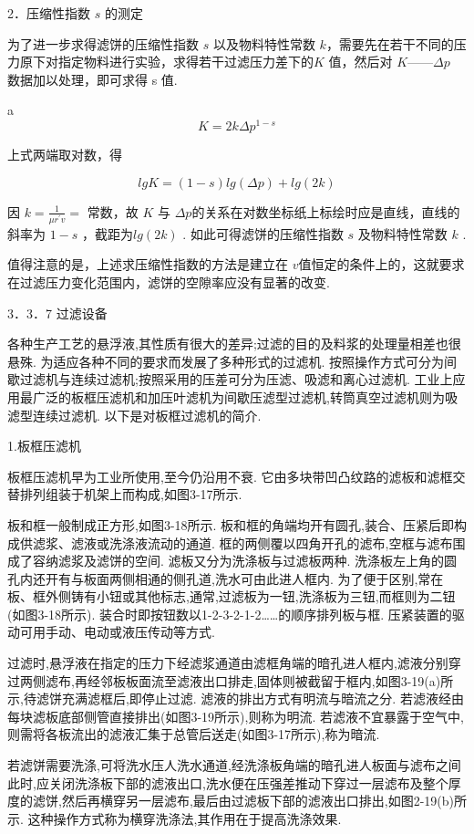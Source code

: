 \documentclass[
]{article}
\begin{document}
2．压缩性指数 \(s\) 的测定

为了进一步求得滤饼的压缩性指数 \(s\) 以及物料特性常数 \(k\)，需要先在若干不同的压力原下对指定物料进行实验，求得若干过滤压力差下的\(K\) 值，然后对 \(K——\Delta p\) 数据加以处理，即可求得 s 值. 

a\[K = 2k\Delta p^{1 - s}\]

上式两端取对数，得

\[lgK = (1 - s)lg(\Delta p) + lg(2k)\]

因 \(k = \frac{1}{\mu r^{'}v} =\) 常数，故 \(K\) 与 \(\Delta p\)的关系在对数坐标纸上标绘时应是直线，直线的斜率为 \(1 - s\) ，截距为\(lg(2k)\) . 如此可得滤饼的压缩性指数 \(s\) 及物料特性常数 \(k\) . 

值得注意的是，上述求压缩性指数的方法是建立在 \(v\)值恒定的条件上的，这就要求在过滤压力变化范围内，滤饼的空隙率应没有显著的改变. 

3．3．7 过滤设备

各种生产工艺的悬浮液,其性质有很大的差异;过滤的目的及料浆的处理量相差也很悬殊. 为适应各种不同的要求而发展了多种形式的过滤机. 按照操作方式可分为间歇过滤机与连续过滤机;按照采用的压差可分为压滤、吸滤和离心过滤机. 工业上应用最广泛的板框压滤机和加压叶滤机为间歇压滤型过滤机,转筒真空过滤机则为吸滤型连续过滤机. 以下是对板框过滤机的简介.

1.板框压滤机

板框压滤机早为工业所使用,至今仍沿用不衰. 它由多块带凹凸纹路的滤板和滤框交替排列组装于机架上而构成,如图3-17所示. 

板和框一般制成正方形,如图3-18所示. 板和框的角端均开有圆孔,装合、压紧后即构成供滤浆、滤液或洗涤液流动的通道. 框的两侧覆以四角开孔的滤布,空框与滤布围成了容纳滤浆及滤饼的空间. 滤板又分为洗涤板与过滤板两种. 洗涤板左上角的圆孔内还开有与板面两侧相通的侧孔道,洗水可由此进人框内. 为了便于区别,常在板、框外侧铸有小钮或其他标志,通常,过滤板为一钮,洗涤板为三钮,而框则为二钮(如图3-18所示). 装合时即按钮数以1-2-3-2-1-2\ldots\ldots 的顺序排列板与框. 压紧装置的驱动可用手动、电动或液压传动等方式. 

过滤时,悬浮液在指定的压力下经滤浆通道由滤框角端的暗孔进人框内,滤液分别穿过两侧滤布,再经邻板板面流至滤液出口排走,固体则被截留于框内,如图3-19(a)所示,待滤饼充满滤框后,即停止过滤. 滤液的排出方式有明流与暗流之分. 若滤液经由每块滤板底部侧管直接排出(如图3-19所示),则称为明流. 若滤液不宜暴露于空气中,则需将各板流出的滤液汇集于总管后送走(如图3-17所示),称为暗流. 

若滤饼需要洗涤,可将洗水压人洗水通道,经洗涤板角端的暗孔进人板面与滤布之间此时,应关闭洗涤板下部的滤液出口,洗水便在压强差推动下穿过一层滤布及整个厚度的滤饼,然后再横穿另一层滤布,最后由过滤板下部的滤液出口排出,如图2-19(b)所示. 这种操作方式称为横穿洗涤法,其作用在于提高洗涤效果. 
\end{document}
